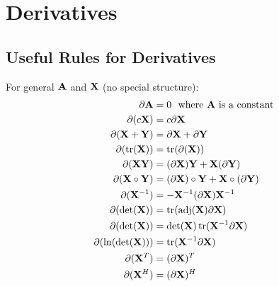 \chapter{Derivatives}

\section{Useful Rules for Derivatives}
For general $\mathbf{A}$ and $\mathbf{X}$ (no special structure):
\begin{align}
\partial\mathbf{A}           &= 0~~\textrm{where $\mathbf{A}$ is a constant} \\
\partial(c\mathbf{X})        &= c\partial\mathbf{X}                          \\
\partial(\mathbf{X}+\mathbf{Y})     &= \partial\mathbf{X}+\partial\mathbf{Y}               \\
\partial(\operatorname{tr}(\mathbf{X})) &= \operatorname{tr}(\partial(\mathbf{X}))                 \\
\partial(\mathbf{X}\mathbf{Y})      &= (\partial\mathbf{X})\mathbf{Y} + \mathbf{X}(\partial\mathbf{Y})   \\
\partial(\mathbf{X}\circ\mathbf{Y}) &= (\partial\mathbf{X})\circ\mathbf{Y} + \mathbf{X}\circ(\partial\mathbf{Y}) \\
\partial(\mathbf{X}^{-1})    &= -\mathbf{X}^{-1}(\partial\mathbf{X})\mathbf{X}^{-1}        \\
\partial(\det(\mathbf{X}))   &= \operatorname{tr}(\textrm{adj}(\mathbf{X})\partial\mathbf{X})  \\
\partial(\det(\mathbf{X}))   &= \det(\mathbf{X})\operatorname{tr}(\mathbf{X}^{-1}\partial\mathbf{X})  \\
\partial(\ln(\det(\mathbf{X}))) &= \operatorname{tr}(\mathbf{X}^{-1}\partial\mathbf{X})        \\
\partial(\mathbf{X}^T)       &= (\partial\mathbf{X})^T                       \\
\partial(\mathbf{X}^H)       &= (\partial\mathbf{X})^H                       
\end{align}